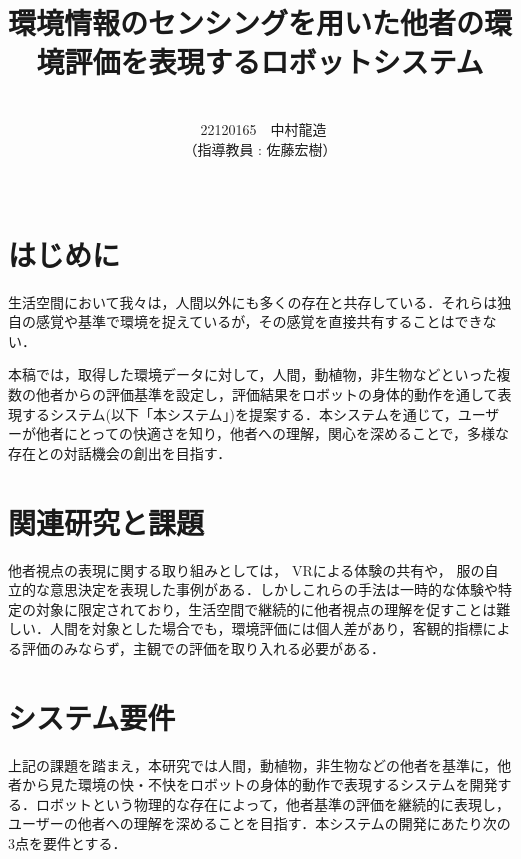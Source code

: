 \documentclass[paper=a4paper,jafontsize=9pt,head_space=15mm,gutter=20mm,
twocolumn,number_of_lines=49, line_length=26zw]{myuarticle}
\begin{document}
\title{{\Large\bfseries\gtfamily 環境情報のセンシングを用いた他者の環境評価を表現するロボットシステム}}
\author{\\\ 22120165　中村龍造 \\ （指導教員 : 佐藤宏樹）\\ \\}
\date{}
\maketitle

\section{はじめに}
生活空間において我々は，人間以外にも多くの存在と共存している．それらは独自の感覚や基準で環境を捉えているが，その感覚を直接共有することはできない．%

本稿では，取得した環境データに対して，人間，動植物，非生物などといった複数の他者からの評価基準を設定し，評価結果をロボットの身体的動作を通して表現するシステム(以下「本システム」)を提案する．本システムを通じて，ユーザーが他者にとっての快適さを知り，他者への理解，関心を深めることで，多様な存在との対話機会の創出を目指す．

\section{関連研究と課題}

他者視点の表現に関する取り組みとしては，
VRによる体験の共有や\cite{--EyesAnimal}，
服の自立的な意思決定を表現した事例\cite{--ソンヨン}がある．しかしこれらの手法は一時的な体験や特定の対象に限定されており，生活空間で継続的に他者視点の理解を促すことは難しい．人間を対象とした場合でも，環境評価には個人差があり，客観的指標による評価のみならず，主観での評価を取り入れる必要がある\cite{Coulby-2020-ScopingReviewTechnologicalApproaches}．

\section{システム要件}

上記の課題を踏まえ，本研究では人間，動植物，非生物などの他者を基準に，他者から見た環境の快・不快をロボットの身体的動作で表現するシステムを開発する．ロボットという物理的な存在によって，他者基準の評価を継続的に表現し，ユーザーの他者への理解を深めることを目指す．本システムの開発にあたり次の3点を要件とする．
\end{document}
